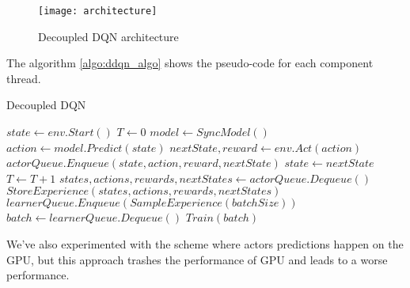 \begin{figure}[h!]
\caption{Decoupled DQN architecture}
\texttt{[image: architecture]}
\label{fig:architecture}
\end{figure}

The algorithm \ref{algo:ddqn_algo} shows the pseudo-code for each component thread.
\begin{algorithm}
    \caption{Decoupled DQN}\label{actor}
    \begin{algorithmic}
            \State $state \gets env.Start()$
            \State $T \gets 0$
                    \State $model \gets SyncModel()$
                \EndIf
                \State $action \gets model.Predict(state)$
                \State $nextState, reward \gets env.Act(action)$
                \State $actorQueue.Enqueue(state, action, reward, nextState)$
                \State $state \gets nextState$
                \State $T \gets T + 1$
            \EndWhile
        \EndProcedure
        \Statex
                \State $states, actions, rewards, nextStates \gets actorQueue.Dequeue()$
                \State $StoreExperience(states, actions, rewards, nextStates)$
                \State $learnerQueue.Enqueue(SampleExperience(batchSize))$
            \EndWhile
        \EndProcedure
        \Statex
                \State $batch \gets learnerQueue.Dequeue()$
                \State $Train(batch)$
            \EndFor
        \EndProcedure
    \end{algorithmic}
    \label{algo:ddqn_algo}
\end{algorithm}

We've also experimented with the scheme where actors predictions happen on the GPU, but this
approach trashes the performance of GPU and leads to a worse performance. %

